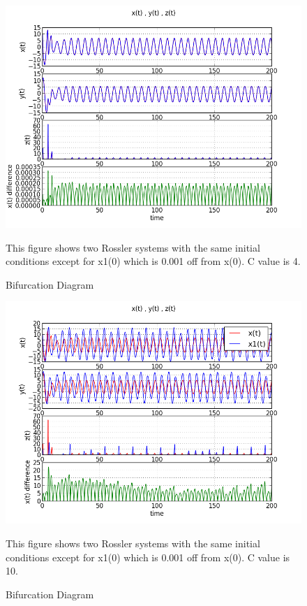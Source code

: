 \documentclass[letterpaper,12pt]{article}
\begin{document}
\FloatBarrier
\begin{figure}[h]
\centering
\includegraphics[scale=0.7]{1_e_4.png}
\caption{Bifurcation Diagram}
This figure shows two Rossler systems with the same initial conditions except for x1(0) which is 0.001 off from x(0). C value is 4.
\end{figure}
\FloatBarrier


\FloatBarrier
\begin{figure}[h]
\centering
\includegraphics[scale=0.7]{1_e_10.png}
\caption{Bifurcation Diagram}
This figure shows two Rossler systems with the same initial conditions except for x1(0) which is 0.001 off from x(0). C value is 10.
\end{figure}
\FloatBarrier
\end{document}
